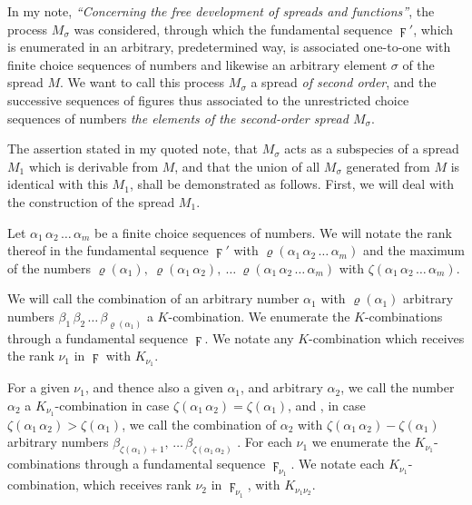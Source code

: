 \documentclass{amsart}
\newcommand\Rank[1]{\varrho\left(#1\right)}
\newcommand\Max[1]{\zeta\left(#1\right)}
\begin{document}


In my note, \emph{``Concerning the free development of spreads and
functions''}, the process $M_\sigma$ was considered, through which
the fundamental sequence $\digamma'$, which is enumerated in an arbitrary,
predetermined way, is associated one-to-one with finite choice sequences of
numbers and likewise an arbitrary element $\sigma$ of the spread $M$. We want to call this process $M_\sigma$ a
spread \emph{of second order}, and the successive sequences of figures thus
associated to the unrestricted choice sequences of numbers  \emph{the elements of the second-order spread $M_\sigma$}.

The assertion stated in my quoted note, that $M_\sigma$ acts as a subspecies of
a spread $M_1$ which is derivable from $M$, and that the union of all
$M_\sigma$ generated from $M$ is identical with this $M_1$, shall be
demonstrated as follows. First, we will deal with the construction of the
spread $M_1$.

Let $\alpha_1\, \alpha_2\, \dots\, \alpha_m$ be a finite choice sequences of
numbers. We will notate the rank thereof in the fundamental sequence
$\digamma'$ with $\Rank{\alpha_1\,\alpha_2\,\dots\,\alpha_m}$ and the maximum
of the numbers $\Rank{\alpha_1},\ \Rank{\alpha_1\,\alpha_2},\ \dots\
\Rank{\alpha_1\,\alpha_2\,\dots\,\alpha_m}$ with
$\Max{\alpha_1\,\alpha_2\,\dots\,\alpha_m}$.

We will call the combination of an arbitrary number $\alpha_1$ with
$\Rank{\alpha_1}$ arbitrary numbers
$\beta_1\,\beta_2\,\dots\,\beta_{\Rank{\alpha_1}}$ a $K$-combination. We
enumerate the $K$-combinations through a fundamental sequence $\digamma$. We
notate any $K$-combination which receives the rank $\nu_1$ in $\digamma$ with
$K_{\nu_1}$.

For a given $\nu_1$, and thence also a given $\alpha_1$, and arbitrary
$\alpha_2$, we call the number $\alpha_2$ a $K_{\nu_1}$-combination in case
$\Max{\alpha_1\,\alpha_2} = \Max{\alpha_1}$, and \EdMark{likewise}, in case
$\Max{\alpha_1\,\alpha_2} > \Max{\alpha_1}$, we call the combination of
$\alpha_2$ with $\Max{\alpha_1\,\alpha_2} - \Max{\alpha_1}$ arbitrary numbers
$\beta_{\Max{\alpha_1}+1},\,\dots\,\beta_{\Max{\alpha_1\,\alpha_2}}$ \EdMark{a
$K_{\nu_1}$-combination}. For each $\nu_1$ we enumerate the
$K_{\nu_1}$-combinations through a fundamental sequence $\digamma_{\nu_1}$. We
notate each $K_{\nu_1}$-combination, which receives rank $\nu_2$ in
$\digamma_{\nu_1}$, with $K_{\nu_1\nu_2}$.
\end{document}

